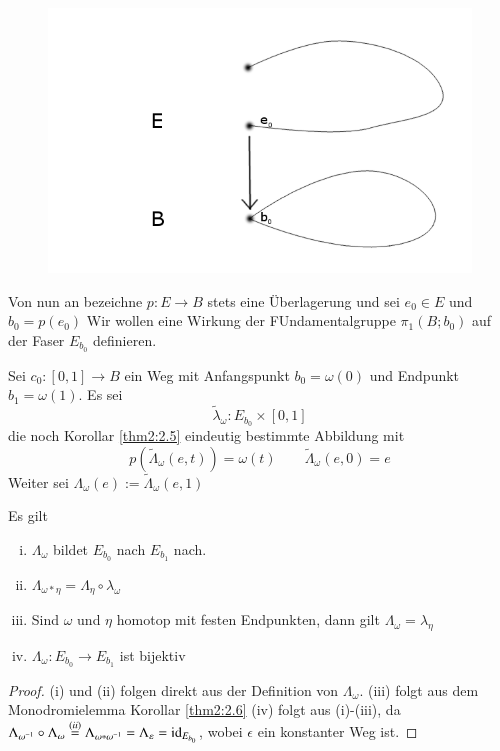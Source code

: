 \documentclass[a4paper,10pt]{scrartcl}
\begin{document}
\begin{figure}[H]
\centering
\includegraphics[scale=0.3]{fig77.png} 
\end{figure}
Von nun an bezeichne $p: E \to B$ stets eine Überlagerung und sei $e_0 \in E$ und $b_0=p(e_0)$
Wir wollen eine Wirkung der FUndamentalgruppe $\pi_1(B; b_0)$ auf der Faser $E_{b_0}$ definieren.\\

\begin{df}
 Sei $c_0:[0,1]\to B$ ein Weg mit Anfangspunkt $b_0=\omega(0)$ und Endpunkt $b_1=\omega(1)$. Es sei
\[
 \tilde \lambda_\omega: E_{b_0} \times [0,1]
\]
die noch Korollar \ref{thm2:2.5} eindeutig bestimmte Abbildung mit
\[
 p(\tilde \Lambda_\omega (e,t))=\omega(t) \qquad \tilde \Lambda_{\omega}(e,0)=e
\]
Weiter sei $\Lambda_\omega(e):= \tilde \Lambda_\omega(e,1)$
\end{df}
\begin{lem}\label{thm2:3.7}
 Es gilt
\begin{enumerate}[(i)]
 \item $\Lambda_\omega$ bildet $E_{b_0}$ nach $E_{b_1}$ nach.
 \item $\Lambda_{\omega*\eta}=\Lambda_{\eta} \circ \lambda_\omega$
 \item Sind $\omega$ und $\eta$ homotop mit festen Endpunkten, dann gilt $\Lambda_\omega=\lambda_\eta$
 \item $\Lambda_\omega: E_{b_0} \to E_{b_1}$ ist bijektiv
\end{enumerate}
\end{lem}
\begin{proof}
 (i) und (ii)  folgen direkt aus der Definition von $\Lambda_\omega$. (iii) folgt aus dem Monodromielemma Korollar \ref{thm2:2.6} (iv) folgt aus (i)-(iii), da $\Lambda_{\omega^{-1}}\circ \Lambda_\omega\stackrel{(ii)}{=} \Lambda_{\omega*\omega^{-1}}=\Lambda_\varepsilon=\operatorname{id}_{E_{b_0}}$, wobei $\epsilon$ ein konstanter Weg ist. 
\end{proof}
\end{document}
